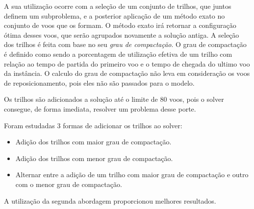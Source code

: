  A sua utilização ocorre com a seleção de um conjunto de trilhos, que juntos definem um subproblema, e a posterior aplicação de um método exato no conjunto de voos que os formam. O método exato irá retornar a configuração ótima desses voos, que serão agrupados novamente a solução antiga. A seleção dos trilhos é feita com base no seu \textit{grau de compactação}. O grau de compactação é definido como sendo a porcentagem de utilização efetiva de um trilho com relação ao tempo de partida do primeiro voo e o tempo de chegada do ultimo voo da instância. O calculo do grau de compactação não leva em consideração os voos de reposicionamento, pois eles não são passados para o modelo.
 
	Os trilhos são adicionados a solução até o limite de 80 voos, pois o solver consegue, de forma imediata, resolver um problema desse porte.
	
	Foram estudadas 3 formas de adicionar os trilhos ao solver:
	
	\begin{itemize}
\item Adição dos trilhos com maior grau de compactação.
\item Adição dos trilhos com menor grau de compactação.
\item Alternar entre a adição de um trilho com maior grau de compactação e outro com o menor grau de compactação.
\end{itemize}
 
 A utilização da segunda abordagem proporcionou melhores resultados.
 
 